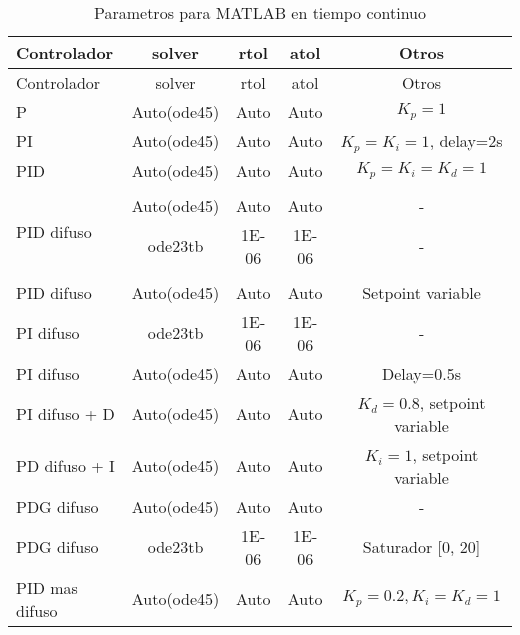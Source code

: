         {\setlength\LTleft{0pt}
        \setlength\LTright{0pt}
        \centering
        \footnotesize
        \renewcommand{\arraystretch}{0.89}
        \begin{longtable}{l @{\extracolsep{\fill}} cccc}
        \caption[Parametros para MATLAB en tiempo continuo]{Parametros para MATLAB en tiempo continuo} 
        \label{tab:parametrosMATLABc} \\
        \toprule
        Controlador  & solver & rtol & atol & Otros       \\ \midrule
        \endfirsthead
        \toprule
        Controlador  & solver & rtol & atol & Otros       \\ \midrule
        \endhead
        \bottomrule
        \endfoot
         P                           & Auto(ode45) &     Auto    &    Auto     & $K_p=1$                       \\
         PI                          & Auto(ode45) &     Auto    &    Auto     & $K_p=K_i=1$, delay=2s         \\
         PID                         & Auto(ode45) &     Auto    &    Auto     & $K_p=K_i=K_d=1$               \\
                                     &             &             &             &                               \\[-3pt]      
         \multirow{2}{*}{PID difuso} & Auto(ode45) &     Auto    &    Auto     & -                             \\
                                     & ode23tb     & \num{1E-06} & \num{1E-06} & -                             \\
                                     &             &             &             &                               \\[-3pt]
         PID difuso                  & Auto(ode45) &     Auto    &    Auto     & Setpoint variable             \\
         PI difuso                   & ode23tb     & \num{1E-06} & \num{1E-06} & -                             \\
         PI difuso                   & Auto(ode45) &     Auto    &    Auto     & Delay=0.5s                    \\
         PI difuso + D               & Auto(ode45) &     Auto    &    Auto     & $K_d=0.8$, setpoint variable  \\
         PD difuso + I               & Auto(ode45) &     Auto    &    Auto     & $K_i=1$, setpoint variable    \\
         PDG difuso                  & Auto(ode45) &     Auto    &    Auto     & -                             \\
         PDG difuso                  & ode23tb     & \num{1E-06} & \num{1E-06} & Saturador [0, 20]             \\
         PID mas difuso              & Auto(ode45) &     Auto    &    Auto     & $K_p=0.2, K_i=K_d=1$          \\
        \end{longtable}}

